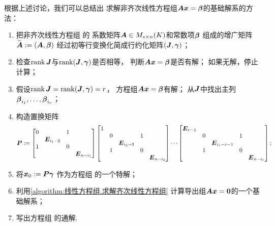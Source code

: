 根据上述讨论，我们可以总结出
求解非齐次线性方程组\(\boldsymbol{A} \boldsymbol{x} = \boldsymbol\beta\)的基础解系的方法：
\begin{algorithm}[求解非齐次线性方程组]
\hfill
\begin{enumerate}
	\item 把非齐次线性方程组  的
	系数矩阵\(\boldsymbol{A} \in M_{s \times n}(K)\)和常数项\(\boldsymbol\beta\)
	组成的增广矩阵\(\widetilde{\boldsymbol{A}} := (\boldsymbol{A},\boldsymbol\beta)\)
	经过初等行变换化简成行约化矩阵\((\boldsymbol{J},\boldsymbol\gamma)\)；

	\item 检查\(\rank\boldsymbol{J}\)与\(\rank(\boldsymbol{J},\boldsymbol\gamma)\)是否相等，
	判断\(\boldsymbol{A} \boldsymbol{x} = \boldsymbol\beta\)是否有解；
	如果无解，停止计算；

	\item 假设\(\rank\boldsymbol{J} = \rank(\boldsymbol{J},\boldsymbol\gamma) = r\)，
	方程组\(\boldsymbol{A} \boldsymbol{x} = \boldsymbol\beta\)有解；
	从\(\boldsymbol{J}\)中找出主列\(\boldsymbol\beta_{i_1},\dotsc,\boldsymbol\beta_{i_r}\)；

	\item 构造置换矩阵\begin{equation*}
		\boldsymbol{P}
		:=
		\begin{bmatrix}
			0 & & 1 \\
			& \boldsymbol{E}_{i_1-2} \\
			1 & & 0 \\
			& & & \boldsymbol{E}_{n-i_1}
		\end{bmatrix}
		\begin{bmatrix}
			1 \\
			& 0 & & 1 \\
			& & \boldsymbol{E}_{i_2-3} \\
			& 1 & & 0 \\
			& & & & \boldsymbol{E}_{n-i_2}
		\end{bmatrix}
		\dotsm
		\begin{bmatrix}
			\boldsymbol{E}_{r-1} \\
			& 0 & & 1 \\
			& & \boldsymbol{E}_{i_r-r-1} \\
			& 1 & & 0 \\
			& & & & \boldsymbol{E}_{n-i_r}
		\end{bmatrix};
	\end{equation*}

	\item
	将\(\boldsymbol{x}_0 := \boldsymbol{P} \boldsymbol\gamma\)
	作为方程组  的一个特解；

	\item 利用\cref{algorithm:线性方程组.求解齐次线性方程组}
	计算导出组\(\boldsymbol{A} \boldsymbol{x} = \boldsymbol0\)的一个基础解系；

	\item 写出方程组  的通解.
\end{enumerate}
\end{algorithm}

